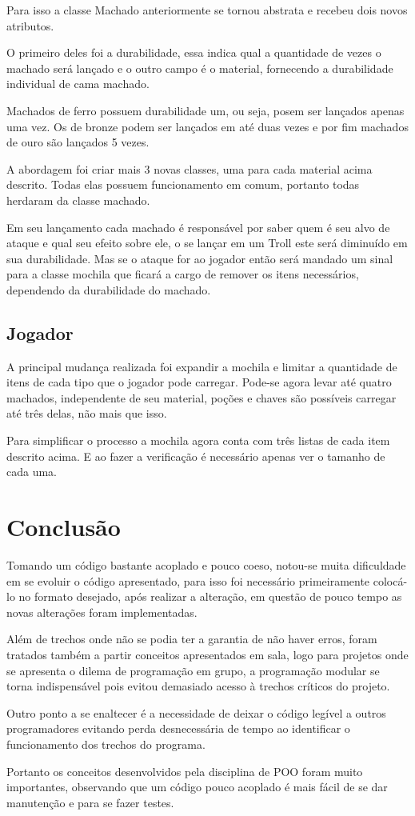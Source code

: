\documentclass[runningheads,a4paper]{llncs}
\begin{document}
		Para isso a classe Machado anteriormente se tornou abstrata e recebeu dois novos atributos. 
		
		O primeiro deles foi a durabilidade, essa indica qual a quantidade de vezes o machado será lançado e o outro campo é o material, fornecendo a durabilidade individual de cama machado.
		
		Machados de ferro possuem durabilidade um, ou seja, posem ser lançados apenas uma vez. Os de bronze podem ser lançados em até duas vezes e por fim machados de ouro são lançados 5 vezes.
		
		A abordagem foi criar mais 3 novas classes, uma para cada material acima descrito. Todas elas possuem funcionamento em comum, portanto todas herdaram da classe machado.
		
		Em seu lançamento cada machado é responsável por saber quem é seu alvo de ataque e qual seu efeito sobre ele, o se lançar em um Troll este será diminuído em sua durabilidade. Mas se o ataque for ao jogador então será mandado um sinal para a classe mochila que ficará a cargo de remover os itens necessários, dependendo da durabilidade do machado.
		
	\subsection{Jogador}
		A principal mudança realizada foi expandir a mochila e limitar a quantidade de itens de cada tipo que o jogador pode carregar. Pode-se agora levar até quatro machados, independente de seu material, poções e chaves são possíveis carregar até três delas, não mais que isso. 
		
		Para simplificar o processo a mochila agora conta com três listas de cada item descrito acima. E ao fazer a verificação é necessário apenas ver o tamanho de cada uma. 

\section{Conclusão}
	Tomando um código bastante acoplado e pouco coeso, notou-se muita dificuldade em se evoluir o código apresentado, para isso foi necessário primeiramente colocá-lo no formato desejado, após realizar a alteração, em questão de pouco tempo as novas alterações foram implementadas. 
	
	Além de trechos onde não se podia ter a garantia de não haver erros, foram tratados também a partir conceitos apresentados em sala,	logo para projetos onde se apresenta o dilema de programação em grupo, a programação modular se torna indispensável pois evitou demasiado acesso à trechos críticos do projeto. 
	
	Outro ponto a se enaltecer é a necessidade de deixar o código legível a outros programadores evitando perda desnecessária de tempo ao identificar o funcionamento dos trechos do programa.

	Portanto os conceitos desenvolvidos pela disciplina de POO foram muito importantes, observando que um código pouco acoplado é mais fácil de se dar manutenção e para se fazer testes.


\nocite{*} 
\end{document}
